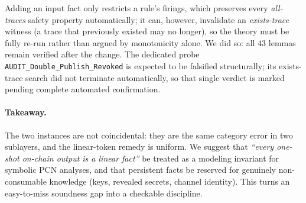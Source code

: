 Adding an input fact only restricts a rule's firings, which preserves every
\emph{all-traces} safety property automatically; it can, however, invalidate an
\emph{exists-trace} witness (a trace that previously existed may no longer),
so the theory must be fully re-run rather than argued by monotonicity alone. We
did so: all $43$ lemmas remain verified after the change. The dedicated probe
\texttt{AUDIT\_Double\_Publish\_Revoked} is expected to be falsified
structurally; its exists-trace search did not terminate automatically, so that
single verdict is marked pending complete automated confirmation.

\paragraph{Takeaway.}
The two instances are not coincidental: they are the same category error in two
sublayers, and the linear-token remedy is uniform. We suggest that
\emph{``every one-shot on-chain output is a linear fact''} be treated as a
modeling invariant for symbolic PCN analyses, and that persistent facts be
reserved for genuinely non-consumable knowledge (keys, revealed secrets,
channel identity). This turns an easy-to-miss soundness gap into a checkable
discipline.

